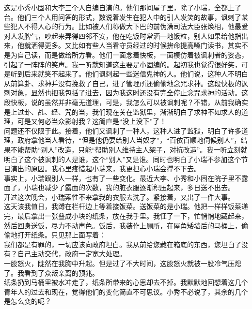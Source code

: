 这是小秀小固和大李三个人自编自演的。他们那间屋子里，除了小瑞，全都上了台。他们三个人用问答的形式，数说着发生在犯人中的引人发笑的故事，讽刺了某些犯人不得人心的行为。比如被人们称做大下巴的前伪满司法大臣张焕相，他最爱对人发脾气，吵起来弄得四邻不安，他在吃饭时常洒一地饭粒，别人如果给他指出来，他就洒得更多。又比如有些人当看守员经过的时候拚命提高嗓门读书，其实不是为自己读，而是做给所方看。他们一面念着快板，一面模仿着被讽刺者的姿态，引起了一阵阵的笑声。我一听就知道这主要是小固编的。起初我也觉得很好笑，可是听到后来就笑不起来了。他们讽刺起一些迷信鬼神的人。他们说，这种人不明白从前算卦、求神并没有挽救了自己，进了管理所还偷偷地念咒求神。这段快板的讽刺对象，显然也把我包括了进去，因为我这时还没有完全停止念咒求神的活动。这段快板，说的虽然并非毫无道理，可是，我怎么可以被讽刺呢？不错，从前我确实是上过卦、乩、经、咒的当，我们现在关在监狱里，渐渐明白了求神不如求人的道理，可是又何必当众影射我？这简直是“没上没下”了！\\

问题还不仅限于此。接着，他们又讽刺了一种人，这种人进了监狱，明白了许多道理，政府拿他当人看待，“但是他仍要给别人当奴才”，“百依百顺地伺候别人”，结果不能帮助“别人”改造，只能“帮助别人维持主人架子，对抗改造”。我一听立刻就明白了这个被讽刺的人是谁，这个“别人”又是谁。同时也明白了小瑞不参加这个节目演出的原因。我心里疼惜起小瑞来，我更担心小瑞会撑不下去。\\

事实上，小瑞跟别人一样，也有了一些变化。最近大李、小秀和小固在院子里不露面了，小瑞也减少了露面的次数，我的脏衣服逐渐积压起来，多日送不出去。\\

开过这次晚会，小瑞索性不来拿我的衣服去洗了。紧接着，又出了一件大事。\\

这天该我值日，我蹲在栏杆边上等着接饭菜。送饭菜的是小瑞。他把一样样饭菜递完，最后拿出一张叠成小块的纸条，放在我手里。我怔了一下，忙悄悄地藏起来，然后回身送饭，尽力不动声色。饭后，我装作上厕所，在屋角矮墙后的马桶上，偷偷地打开纸条。只见那上面写着：\\

我们都是有罪的，一切应该向政府坦白。我从前给您藏在箱底的东西，您坦白了没有？自己主动交代，政府一定宽大处理。\\

一股怒火，陡然在我胸中升起。但是过了不大时间，这股怒火就被一股冷气压熄了。我看到了众叛亲离的预兆。\\

纸条扔到马桶里被水冲走了，纸条所带来的心思却去不掉。我默默地回想着这几个青年人的过去和现在，觉得他们的变化简直不可思议。小秀不必说了，其余的几个是怎么变的呢？\\

